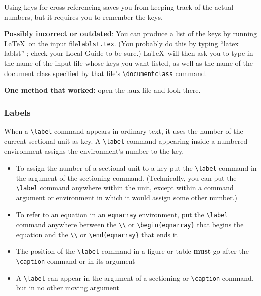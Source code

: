 \documentclass{article}
\newcommand{\justtext}[1]{\texttt{\textbackslash #1}}
\begin{document}
Using keys for cross-referencing saves you from keeping track of the actual numbers, but it requires
you to remember the keys. 

\textbf{Possibly incorrect or outdated}: You can produce a list of the keys by running \LaTeX\ on the
 input file{\tt lablst.tex}. (You probably do this by typing ``latex lablst'' ; check your Local
 Guide to be sure.) \LaTeX\ will then ask you to type in the name of the input file whose keys you
 want listed, as well as the name of the document class specified by that file's 
 \justtext{documentclass} command.
 
 \textbf{One method that worked:} open the .aux file and look there.
 
\subsubsection{Labels}

When a \justtext{label} command appears in ordinary text, it uses the number of the current
sectional unit as key. A \justtext{label} command appearing inside a numbered environment assigns
the environment's number to the key.

\begin{itemize}
   
   \item To assign the number of a sectional unit to a key put the \justtext{label} command in the
    argument of the sectioning command. (Technically, you can put the \justtext{label} command
    anywhere within the unit, except within a command argument or environment in which it would
    assign some other number.)

   \item To refer to an equation in an {\tt eqnarray} environment, put the \justtext{label} command 
    anywhere between the \justtext{\textbackslash} or \justtext{begin\{eqnarray\}} that begins the 
    equation and the \justtext{\textbackslash} or \justtext{end\{eqnarray\}} that ends it

   \item The position of the \justtext{label} command in a figure or table \textbf{must} go after
    the \justtext{caption} command or in its argument
    
   \item A \justtext{label} can appear in the argument of a sectioning or \justtext{caption} 
    command, but in no other moving argument

\end{itemize}
\end{document}
